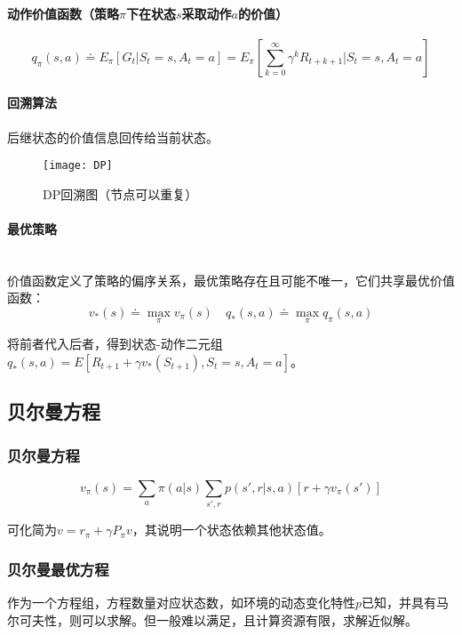 \documentclass[
12pt, %
a4paper, 
oneside, %
headinclude,footinclude, %
]{scrartcl}
\begin{document}
\paragraph{动作价值函数（策略$ \pi $下在状态$ s $采取动作$ a $的价值）}
$$ q_\pi(s, a) \doteq E_\pi[G_t|S_t = s, A_t = a] = E_\pi[\sum_{k = 0}^{\infty} \gamma^k R_{t + k + 1}|S_t = s, A_t = a] $$
\paragraph{回溯算法}
后继状态的价值信息回传给当前状态。

\begin{figure}[H]
\centering 
\texttt{[image: DP]} 
\caption[DP回溯图]{DP回溯图（节点可以重复）}
\end{figure}
\paragraph{最优策略}~\\

价值函数定义了策略的偏序关系，最优策略存在且可能不唯一，它们共享最优价值函数：
$$ v_*(s) \doteq \max_{\pi} v_{\pi}(s) \quad q_*(s, a) \doteq \max_{\pi} q_{\pi}(s, a) $$

将前者代入后者，得到状态-动作二元组$ q_*(s, a) = E[R_{t + 1} + \gamma v_*(S_{t + 1}), S_t = s, A_t = a] $。
\subsection{贝尔曼方程}
\subsubsection{贝尔曼方程}
$$
v_\pi(s) = \sum_a \pi(a|s) \sum_{s', r} p(s', r|s, a) [r + \gamma v_\pi(s')]
$$

可化简为$ v = r_\pi + \gamma P_\pi v $，其说明一个状态依赖其他状态值。
\subsubsection{贝尔曼最优方程}
作为一个方程组，方程数量对应状态数，如环境的动态变化特性$ p $已知，并具有马尔可夫性，则可以求解。但一般难以满足，且计算资源有限，求解近似解。
\end{document}

